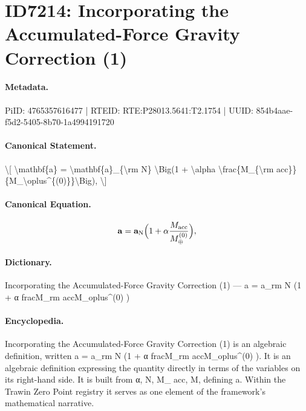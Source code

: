 \section*{ID7214: Incorporating the Accumulated-Force Gravity Correction (1)}
\paragraph{Metadata.}
PiID: 4765357616477 | RTEID: RTE:P28013.5641:T2.1754 | UUID: 854b4aae-f5d2-5405-8b70-1a4994191720

\paragraph{Canonical Statement.}
\textbackslash{}[ \textbackslash{}mathbf\{a\} = \textbackslash{}mathbf\{a\}\_\{\textbackslash{}rm N\} \textbackslash{}Big(1 + \textbackslash{}alpha \textbackslash{}frac\{M\_\{\textbackslash{}rm acc\}\}\{M\_\textbackslash{}oplus\textasciicircum{}\{(0)\}\}\textbackslash{}Big), \textbackslash{}]

\paragraph{Canonical Equation.}
\[
\mathbf{a} = \mathbf{a}_{\rm N} \Big(1 + \alpha \frac{M_{\rm acc}}{M_\oplus^{(0)}}\Big),
\]

\paragraph{Dictionary.}
Incorporating the Accumulated-Force Gravity Correction (1) — a = a\_rm N (1 + α fracM\_rm accM\_oplus\textasciicircum{}(0) )

\paragraph{Encyclopedia.}
Incorporating the Accumulated-Force Gravity Correction (1) is an algebraic definition, written a = a\_rm N (1 + α fracM\_rm accM\_oplus\textasciicircum{}(0) ). It is an algebraic definition expressing the quantity directly in terms of the variables on its right-hand side. It is built from α, N, M\_ acc, M, defining a. Within the Trawin Zero Point registry it serves as one element of the framework's mathematical narrative.

